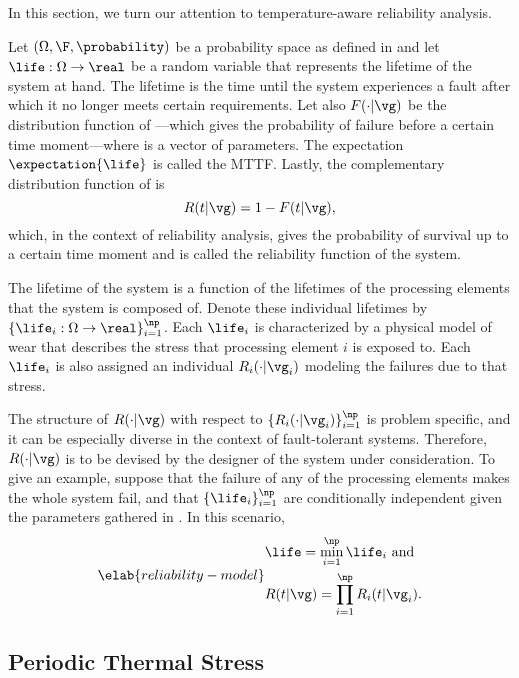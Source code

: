 In this section, we turn our attention to temperature-aware reliability
analysis.

Let $(\Omega, \F, \probability)$ be a probability space as defined in
 and let $\life: \Omega \to \real$ be a random variable
that represents the lifetime of the system at hand. The lifetime is the time
until the system experiences a fault after which it no longer meets certain
requirements. Let also $F(\cdot | \vg)$ be the distribution function of
\life---which gives the probability of failure before a certain time
moment---where \vg is a vector of parameters. The expectation
$\expectation{\life}$ is called the \ac{MTTF}. Lastly, the complementary
distribution function of \life is
\[
  R(t | \vg) = 1 - F(t | \vg),
\]
which, in the context of reliability analysis, gives the probability of survival
up to a certain time moment and is called the reliability function of the
system.

The lifetime \life of the system is a function of the lifetimes of the \np
processing elements that the system is composed of. Denote these individual
lifetimes by $\{ \life_i: \Omega \to \real \}_{i = 1}^\np$. Each $\life_i$ is
characterized by a physical model of wear \cite{jedec2016} that describes the
stress that processing element $i$ is exposed to. Each $\life_i$ is also
assigned an individual $R_i(\cdot | \vg_i)$ modeling the failures due to that
stress.

The structure of $R(\cdot | \vg)$ with respect to $\{ R_i(\cdot | \vg_i) \}_{i =
1}^\np$ is problem specific, and it can be especially diverse in the context of
fault-tolerant systems. Therefore, $R(\cdot | \vg)$ is to be devised by the
designer of the system under consideration. To give an example, suppose that the
failure of any of the \np processing elements makes the whole system fail, and
that $\{ \life_i \}_{i = 1}^\np$ are conditionally independent given the
parameters gathered in \vg. In this scenario,
\begin{equation} \elab{reliability-model}
  \begin{split}
    & \life = \min_{i = 1}^\np \life_i \text{ and} \\
    & R(t | \vg) = \prod_{i = 1}^\np R_i(t | \vg_i).
  \end{split}
\end{equation}

\subsection{Periodic Thermal Stress}

